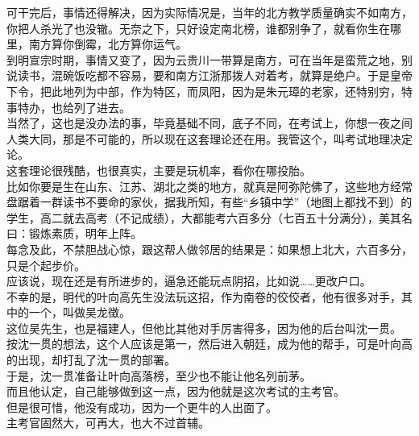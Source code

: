 \begin{multicols}{\theparacolNo}
可干完后，事情还得解决，因为实际情况是，当年的北方教学质量确实不如南方，你把人杀光了也没辙。无奈之下，只好设定南北榜，谁都别争了，就看你生在哪里，南方算你倒霉，北方算你运气。\\

到明宣宗时期，事情又变了，因为云贵川一带算是南方，可在当年是蛮荒之地，别说读书，混碗饭吃都不容易，要和南方江浙那拨人对着考，就算是绝户。于是皇帝下令，把此地列为中部，作为特区，而凤阳，因为是朱元璋的老家，还特别穷，特事特办，也给列了进去。\\

当然了，这也是没办法的事，毕竟基础不同，底子不同，在考试上，你想一夜之间人类大同，那是不可能的，所以现在这套理论还在用。我管这个，叫考试地理决定论。\\

这套理论很残酷，也很真实，主要是玩机率，看你在哪投胎。\\

比如你要是生在山东、江苏、湖北之类的地方，就真是阿弥陀佛了，这些地方经常盘踞着一群读书不要命的家伙，据我所知，有些“乡镇中学”（地图上都找不到）的学生，高二就去高考（不记成绩），大都能考六百多分（七百五十分满分），美其名曰：锻炼素质，明年上阵。\\

每念及此，不禁胆战心惊，跟这帮人做邻居的结果是：如果想上北大，六百多分，只是个起步价。\\

应该说，现在还是有所进步的，逼急还能玩点阴招，比如说……更改户口。\\

不幸的是，明代的叶向高先生没法玩这招，作为南卷的佼佼者，他有很多对手，其中的一个，叫做吴龙徴。\\

这位吴先生，也是福建人，但他比其他对手厉害得多，因为他的后台叫沈一贯。\\

按沈一贯的想法，这个人应该是第一，然后进入朝廷，成为他的帮手，可是叶向高的出现，却打乱了沈一贯的部署。\\

于是，沈一贯准备让叶向高落榜，至少也不能让他名列前茅。\\

而且他认定，自己能够做到这一点，因为他就是这次考试的主考官。\\

但是很可惜，他没有成功，因为一个更牛的人出面了。\\

主考官固然大，可再大，也大不过首辅。\\


\end{multicols}
